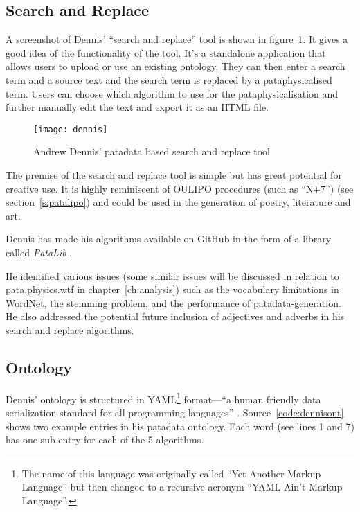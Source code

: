 \subsection{Search and Replace}

A screenshot of Dennis' ``search and replace'' tool \autocite*{Dennis2016} is shown in figure~\ref{img:dennis}. It gives a good idea of the functionality of the tool. It's a standalone application that allows users to upload or use an existing ontology. They can then enter a search term and a source text and the search term is replaced by a pataphysicalised term. Users can choose which algorithm to use for the pataphysicalisation and further manually edit the text and export it as an \ac{HTML} file.

\begin{figure}[!htbp]
  \centering
  \texttt{[image: dennis]}
\caption[Andrew Dennis' search and replace tool]{Andrew Dennis' patadata based search and replace tool}
\label{img:dennis}
\end{figure}

The premise of the search and replace tool is simple but has great potential for creative use. It is highly reminiscent of \ac{OULIPO} procedures (such as ``N+7'') (see section~\ref{s:patalipo}) and could be used in the generation of poetry, literature and art.

Dennis has made his algorithms available on GitHub in the form of a library called \textit{PataLib} \autocite*{Dennis2016a}.

He identified various issues (some similar issues will be discussed in relation to \url{pata.physics.wtf} in chapter~\ref{ch:analysis}) such as the vocabulary limitations in WordNet, the stemming problem, and the performance of patadata-generation. He also addressed the potential future inclusion of adjectives and adverbs in his search and replace algorithms.


\subsection{Ontology}

Dennis' ontology is structured in \acs{YAML}\footnote{The name of this language was originally called ``Yet Another Markup Language'' but then changed to a recursive acronym ``YAML Ain't Markup Language''.} format---``a human friendly data serialization standard for all programming languages'' \autocite{Evans2016}. Source~\ref{code:dennisont} shows two example entries in his patadata ontology. Each word (see lines 1 and 7) has one sub-entry for each of the 5 algorithms.

